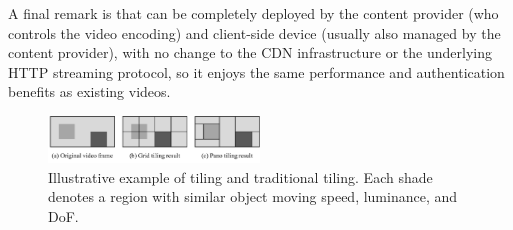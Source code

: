 A final remark is that \name can be completely deployed by the content provider (who controls the video encoding) and client-side device (usually also managed by the content provider), with no change to the CDN infrastructure or the underlying HTTP streaming protocol, so it enjoys the same performance and authentication benefits as existing videos.


\begin{figure}
  \centering
  \includegraphics[width=0.5\textwidth]{figures/tiling.pdf}
  \caption{Illustrative example of \name tiling and traditional tiling. Each shade denotes a region with similar object moving speed, luminance, and DoF.}
  \label{fig:tiling}
 \end{figure}





